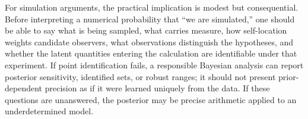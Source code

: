 \documentclass[11pt]{article}
\begin{document}
For simulation arguments, the practical implication is modest but consequential. Before interpreting a numerical probability that ``we are simulated,'' one should be able to say what is being sampled, what carries measure, how self-location weights candidate observers, what observations distinguish the hypotheses, and whether the latent quantities entering the calculation are identifiable under that experiment. If point identification fails, a responsible Bayesian analysis can report posterior sensitivity, identified sets, or robust ranges; it should not present prior-dependent precision as if it were learned uniquely from the data. If these questions are unanswered, the posterior may be precise arithmetic applied to an underdetermined model.



\end{document}
